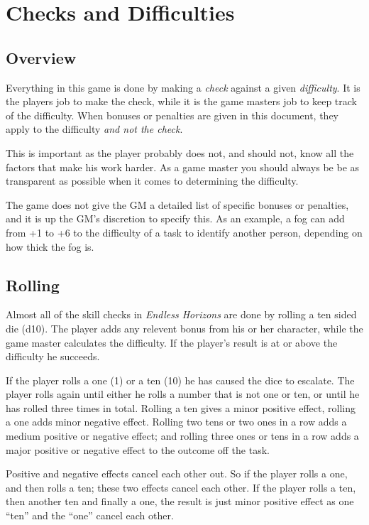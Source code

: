 \chapter{Checks and Difficulties}
\label{chap:Checks and Difficulties}

\section{Overview}
\label{sec:3-Overview}

Everything in this game is done by making a \emph{check} against a given
\emph{difficulty}. It is the players job to make the check, while it is the
game masters job to keep track of the difficulty. When bonuses or penalties
are given in this document, they apply to the difficulty \emph{and not the
  check}.

This is important as the player probably does not, and should not, know all
the factors that make his work harder. As a game master you should always be
be as transparent as possible when it comes to determining the difficulty.

The game does not give the GM a detailed list of specific bonuses or penalties,
and it is up the GM's discretion to specify this. As an example, a fog can
add from +1 to +6 to the difficulty of a task to identify another person,
depending on how thick the fog is.

\section{Rolling}
\label{sec:3-Rolling}

Almost all of the skill checks in \emph{Endless Horizons} are done by rolling
a ten sided die (d10). The player adds any relevent bonus from his or her
character, while the game master calculates the difficulty. If the player's
result is at or above the difficulty he succeeds.

If the player rolls a one (1) or a ten (10) he has caused the dice to escalate.
The player rolls again until either he rolls a number that is not one or ten,
or until he has rolled three times in total. Rolling a ten gives a minor
positive effect, rolling a one adds minor negative effect. Rolling two tens or
two ones in a row adds a medium positive or negative effect; and rolling three
ones or tens in a row adds a major positive or negative effect to the outcome
off the task.

Positive and negative effects cancel each other out. So if the player rolls a
one, and then rolls a ten; these two effects cancel each other. If the player
rolls a ten, then another ten and finally a one, the result is just minor
positive effect as one ``ten'' and the ``one'' cancel each other.

